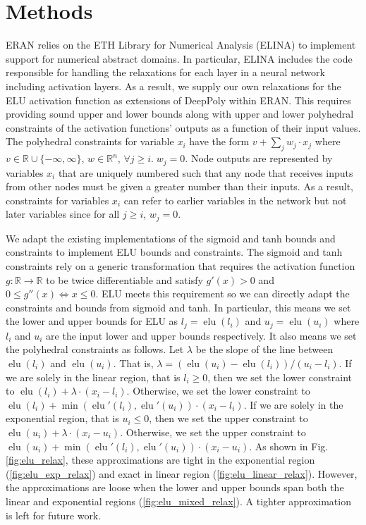 \documentclass{llncs}
\DeclareMathOperator{\elu}{elu}
\begin{document}
\section{Methods}
ERAN relies on the ETH Library for Numerical Analysis (ELINA) \cite{ELINA} to implement support for numerical abstract domains.
In particular, ELINA includes the code responsible for handling the relaxations for each layer in a neural network including activation layers.
As a result, we supply our own relaxations for the ELU activation function as extensions of DeepPoly \cite{singh2019abstract} within ERAN.
This requires providing sound upper and lower bounds along with upper and lower polyhedral constraints of the activation functions' outputs as a function of their input values.
The polyhedral constraints for variable $x_i$ have the form $v + \sum_j w_j \cdot x_j$ where $v \in \mathbb{R} \cup \{-\infty, \infty\}$, $w \in \mathbb{R}^n$, $\forall j \geq i. \; w_j = 0$.
Node outputs are represented by variables $x_i$ that are uniquely numbered such that any node that receives inputs from other nodes must be given a greater number than their inputs.
As a result, constraints for variables $x_i$ can refer to earlier variables in the network but not later variables since for all  $j \geq i$, $w_j = 0$.

We adapt the existing implementations of the sigmoid and tanh bounds and constraints to implement ELU bounds and constraints.
The sigmoid and tanh constraints rely on a generic transformation that requires the activation function $g: \mathbb{R} \rightarrow \mathbb{R}$ to be twice differentiable and satisfy $g'(x) > 0$ and $0 \leq g''(x) \Leftrightarrow x \leq 0$.
ELU meets this requirement so we can directly adapt the constraints and bounds from sigmoid and tanh.
In particular, this means we set the lower and upper bounds for ELU as $l_j = \elu({l_i})$ and $u_j = \elu({u_i})$ where $l_i$ and $u_i$ are the input lower and upper bounds respectively.
It also means we set the polyhedral constraints as follows.
Let $\lambda$ be the slope of the line between $\elu(l_i)$ and $\elu(u_i)$.
That is, $\lambda = (\elu(u_i) - \elu(l_i)) / (u_i - l_i)$.
If we are solely in the linear region, that is $l_i \geq 0$, then we set the lower constraint to $\elu(l_i) + \lambda \cdot (x_i - l_i)$.
Otherwise, we set the lower constraint to $\elu(l_i) + \min(\elu'(l_i), \elu'(u_i)) \cdot (x_i - l_i)$.
If we are solely in the exponential region, that is $u_i \leq 0$, then we set the upper constraint to $\elu(u_i) + \lambda \cdot (x_i - u_i)$.
Otherwise, we set the upper constraint to $\elu(u_i) + \min(\elu'(l_i), \elu'(u_i)) \cdot (x_i - u_i)$.
As shown in Fig. \ref{fig:elu_relax}, these approximations are tight in the exponential region (\ref{fig:elu_exp_relax}) and exact in linear region (\ref{fig:elu_linear_relax}).
However, the approximations are loose when the lower and upper bounds span both the linear and exponential regions (\ref{fig:elu_mixed_relax}).
A tighter approximation is left for future work.
\end{document}
